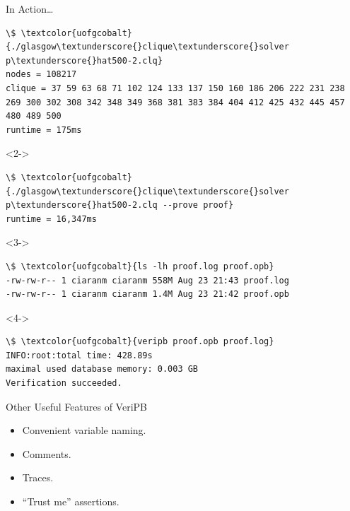 \documentclass{beamer}
\begin{document}
\begin{frame}[t,fragile]{In Action\ldots}
\small\begin{Verbatim}[commandchars=\\\{\},codes={\catcode`$=3\catcode`^=7}]
\$ \textcolor{uofgcobalt}{./glasgow\textunderscore{}clique\textunderscore{}solver p\textunderscore{}hat500-2.clq}
nodes = 108217
clique = 37 59 63 68 71 102 124 133 137 150 160 186 206 222 231 238 269 300 302 308 342 348 349 368 381 383 384 404 412 425 432 445 457 480 489 500
runtime = 175ms
\end{Verbatim}

\begin{onlyenv}<2->\small\begin{Verbatim}[commandchars=\\\{\},codes={\catcode`$=3\catcode`^=7}]
\$ \textcolor{uofgcobalt}{./glasgow\textunderscore{}clique\textunderscore{}solver p\textunderscore{}hat500-2.clq --prove proof}
runtime = 16,347ms
\end{Verbatim}
\end{onlyenv}

\begin{onlyenv}<3->\small\begin{Verbatim}[commandchars=\\\{\},codes={\catcode`$=3\catcode`^=7}]
\$ \textcolor{uofgcobalt}{ls -lh proof.log proof.opb}
-rw-rw-r-- 1 ciaranm ciaranm 558M Aug 23 21:43 proof.log
-rw-rw-r-- 1 ciaranm ciaranm 1.4M Aug 23 21:42 proof.opb
\end{Verbatim}
\end{onlyenv}

\begin{onlyenv}<4->\small\begin{Verbatim}[commandchars=\\\{\},codes={\catcode`$=3\catcode`^=7}]
\$ \textcolor{uofgcobalt}{veripb proof.opb proof.log}
INFO:root:total time: 428.89s
maximal used database memory: 0.003 GB
Verification succeeded.
\end{Verbatim}
\end{onlyenv}
\end{frame}

\begin{frame}{Other Useful Features of VeriPB}
    \begin{itemize}
        \item Convenient variable naming.
        \item Comments.
        \item Traces.
        \item ``Trust me'' assertions.
    \end{itemize}
\end{frame}
\end{document}
